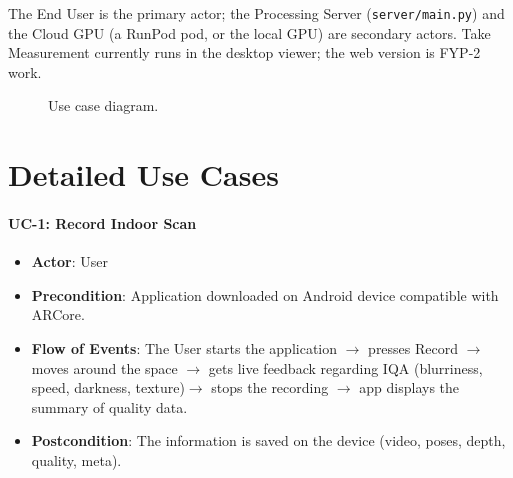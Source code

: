 The End User is the primary actor; the Processing Server (\texttt{server/main.py}) and the Cloud GPU (a RunPod pod, or the local GPU) are secondary actors. Take Measurement currently runs in the desktop viewer; the web version is FYP-2 work.

\begin{figure}[htbp]
\centering
{}
\caption{Use case diagram.}
\label{fig:usecase}
\end{figure}

\section{Detailed Use Cases}

\paragraph{UC-1: Record Indoor Scan}
\begin{itemize}
    \item \textbf{Actor}: User
    \item \textbf{Precondition}: Application downloaded on Android device compatible with ARCore.
    \item \textbf{Flow of Events}: The User starts the application $\rightarrow$ presses Record $\rightarrow$ moves around the space $\rightarrow$ gets live feedback regarding IQA (blurriness, speed, darkness, texture)$\rightarrow$ stops the recording $\rightarrow$ app displays the summary of quality data.
    \item \textbf{Postcondition}: The information is saved on the device (video, poses, depth, quality, meta).
\end{itemize}

